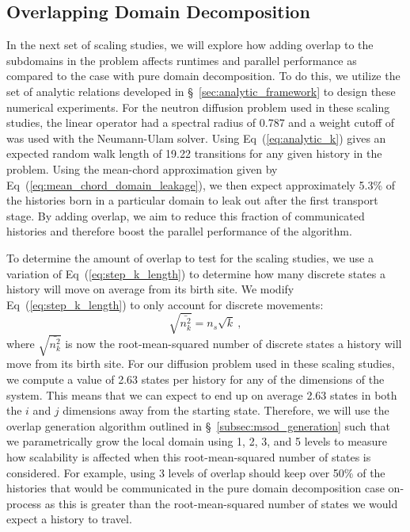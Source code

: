 \clearpage

\subsection{Overlapping Domain Decomposition}
\label{subsec:overlapping_domain_decomp}

In the next set of scaling studies, we will explore how adding overlap
to the subdomains in the problem affects runtimes and parallel
performance as compared to the case with pure domain decomposition. To
do this, we utilize the set of analytic relations developed in
\S~\ref{sec:analytic_framework} to design these numerical
experiments. For the neutron diffusion problem used in these scaling
studies, the linear operator had a spectral radius of 0.787 and a
weight cutoff of  was used with the Neumann-Ulam
solver. Using Eq~(\ref{eq:analytic_k}) gives an expected random walk
length of 19.22 transitions for any given history in the
problem. Using the mean-chord approximation given by
Eq~(\ref{eq:mean_chord_domain_leakage}), we then expect approximately
5.3\% of the histories born in a particular domain to leak out after
the first transport stage. By adding overlap, we aim to reduce this
fraction of communicated histories and therefore boost the parallel
performance of the algorithm. 

To determine the amount of overlap to test for the scaling studies, we
use a variation of Eq~(\ref{eq:step_k_length}) to determine how many
discrete states a history will move on average from its birth site. We
modify Eq~(\ref{eq:step_k_length}) to only account for discrete
movements:
\begin{equation}
  \sqrt{\bar{n^2_k}} = n_s \sqrt{k}\:,
  \label{eq:discrete_distance}
\end{equation}
where $\sqrt{\bar{n^2_k}}$ is now the root-mean-squared number of
discrete states a history will move from its birth site. For our
diffusion problem used in these scaling studies, we compute a value of
2.63 states per history for any of the dimensions of the system. This
means that we can expect to end up on average 2.63 states in both the
$i$ and $j$ dimensions away from the starting state. Therefore, we
will use the overlap generation algorithm outlined in
\S~\ref{subsec:msod_generation} such that we parametrically grow the
local domain using 1, 2, 3, and 5 levels to measure how scalability is
affected when this root-mean-squared number of states is
considered. For example, using 3 levels of overlap should keep over
50\% of the histories that would be communicated in the pure domain
decomposition case on-process as this is greater than the
root-mean-squared number of states we would expect a history to
travel.


